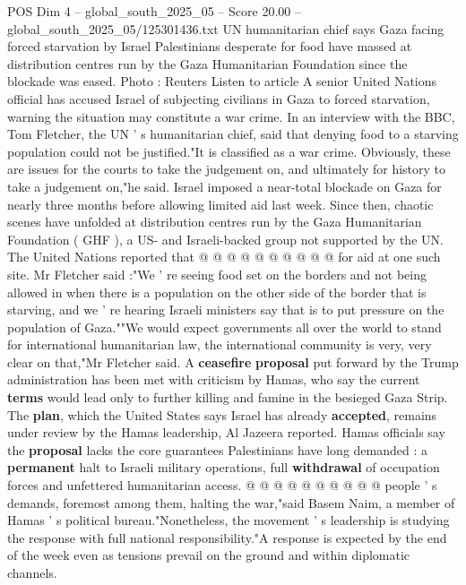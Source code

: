 \begin{textsample}{POS Dim 4 – global\_south\_2025\_05 – Score 20.00 – global\_south\_2025\_05/125301436.txt}  \label{ex:f4_pos_099}
UN humanitarian chief says Gaza facing forced starvation by Israel Palestinians desperate for food have massed at distribution centres run by the Gaza Humanitarian Foundation since the blockade was eased.
Photo : Reuters Listen to article A senior United Nations official has accused Israel of subjecting civilians in Gaza to forced starvation, warning the situation may constitute a war crime.
In an interview with the BBC, Tom Fletcher, the UN ' s humanitarian chief, said that denying food to a starving population could not be justified."It is classified as a war crime.
Obviously, these are issues for the courts to take the judgement on, and ultimately for history to take a judgement on,"he said.
Israel imposed a near-total blockade on Gaza for nearly three months before allowing limited aid last week.
Since then, chaotic scenes have unfolded at distribution centres run by the Gaza Humanitarian Foundation ( GHF ), a US- and Israeli-backed group not supported by the UN.
The United Nations reported that @ @ @ @ @ @ @ @ @ @ for aid at one such site.
Mr Fletcher said :"We ' re seeing food set on the borders and not being allowed in when there is a population on the other side of the border that is starving, and we ' re hearing Israeli ministers say that is to put pressure on the population of Gaza.""We would expect governments all over the world to stand for international humanitarian law, the international community is very, very clear on that,"Mr Fletcher said.
A \textbf{ceasefire} \textbf{proposal} put forward by the Trump administration has been met with criticism by Hamas, who say the current \textbf{terms} would lead only to further killing and famine in the besieged Gaza Strip.
The \textbf{plan}, which the United States says Israel has already \textbf{accepted}, remains under review by the Hamas leadership, Al Jazeera reported.
Hamas officials say the \textbf{proposal} lacks the core guarantees Palestinians have long demanded : a \textbf{permanent} halt to Israeli military operations, full \textbf{withdrawal} of occupation forces and unfettered humanitarian access. @ @ @ @ @ @ @ @ @ @ people ' s demands, foremost among them, halting the war,"said Basem Naim, a member of Hamas ' s political bureau."Nonetheless, the movement ' s leadership is studying the response with full national responsibility."A response is expected by the end of the week even as tensions prevail on the ground and within diplomatic channels.

\end{textsample}
